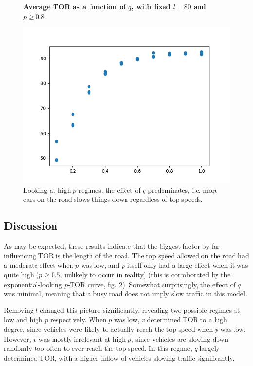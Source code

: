 \documentclass{article}
\begin{document}
\begin{figure}
\textbf{\large Average TOR as a function of $q$, with fixed $l=80$ and $p \geq 0.8$}\par\medskip
{}
\includegraphics[scale = 0.55, left]{./data/phase1/q_vs_timeOnRoad_l=80_highp.png}
\vspace*{0.1cm}\hspace*{4.5cm}{\large $p$}
\caption{\label{fig} Looking at high $p$ regimes, the effect of $q$ predominates, i.e. more cars on the road slows things down regardless of top speeds.}
\end{figure}

\subsection*{Discussion}

As may be expected, these results indicate that the biggest factor by far influencing TOR is the length of the road. The top speed allowed on the road had a moderate effect when $p$ was low, and $p$ itself only had a large effect when it was quite high ($p \geq 0.5$, unlikely to occur in reality) (this is corroborated by the exponential-looking $p$-TOR curve, fig. 2). Somewhat surprisingly, the effect of $q$ was minimal, meaning that a busy road does not imply slow traffic in this model.

Removing $l$ changed this picture significantly, revealing two possible regimes at low and high $p$ respectively. When $p$ was low, $v$ determined TOR to a high degree, since vehicles were likely to actually reach the top speed when $p$ was low. However, $v$ was mostly irrelevant at high $p$, since vehicles are slowing down randomly too often to ever reach the top speed. In this regime, $q$ largely determined TOR, with a higher inflow of vehicles slowing traffic significantly.
\end{document}
